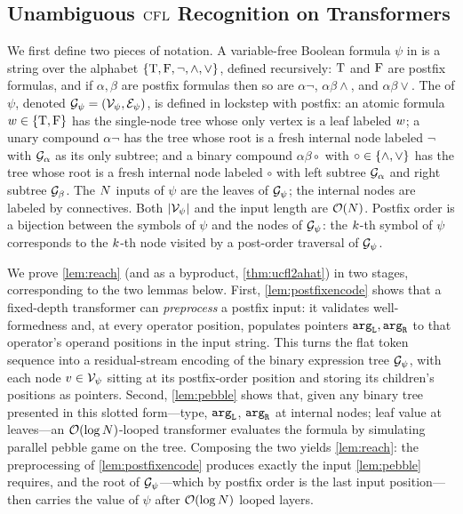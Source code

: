 \documentclass{article}
\begin{document}
\subsection{Unambiguous ${\textsc{CFL}}$ Recognition on Transformers}\label{app:ucflproofs}
We first define two pieces of notation.
A variable-free Boolean formula $\psi$ in  is a string over the alphabet ${{\{ {\mathbin{\mathrm{T}}}, {\mathbin{\mathrm{F}}}, \neg, \land, \lor \}}}$, defined recursively: ${\mathbin{\mathrm{T}}}$ and ${\mathbin{\mathrm{F}}}$ are postfix formulas, and if $\alpha, \beta$ are postfix formulas then so are $\alpha\neg$, $\alpha\beta\land$, and $\alpha\beta\lor$.
The  of $\psi$, denoted ${ \mathcal{G}}_\psi = ({\mathcal{V}}_\psi, {\mathcal{E}}_\psi)$, is defined in lockstep with postfix: an atomic formula ${w} \in {{\{ {\mathbin{\mathrm{T}}}, {\mathbin{\mathrm{F}}}\}}}$ has the single-node tree whose only vertex is a leaf labeled ${w}$; a unary compound $\alpha\neg$ has the tree whose root is a fresh internal node labeled $\neg$ with ${ \mathcal{G}}_\alpha$ as its only subtree; and a binary compound $\alpha\beta\circ$ with $\circ \in {{\{ \land, \lor \}}}$ has the tree whose root is a fresh internal node labeled $\circ$ with left subtree ${ \mathcal{G}}_\alpha$ and right subtree ${ \mathcal{G}}_\beta$.
The ${{ N}}$ inputs of $\psi$ are the leaves of ${ \mathcal{G}}_\psi$; the internal nodes are labeled by connectives.
Both $|{\mathcal{V}}_\psi|$ and the input length are ${{ \mathcal{O}}}({{ N}})$.
Postfix order is a bijection between the symbols of $\psi$ and the nodes of ${ \mathcal{G}}_\psi$: the ${{ k}}$-th symbol of $\psi$ corresponds to the ${{ k}}$-th node visited by a post-order traversal of ${ \mathcal{G}}_\psi$.

We prove \cref{lem:reach} (and as a byproduct, \cref{thm:ucfl2ahat}) in two stages, corresponding to the two lemmas below.
First, \cref{lem:postfixencode} shows that a fixed-depth transformer can \emph{preprocess} a postfix input: it validates well-formedness and, at every operator position, populates pointers ${\mathtt{arg}_\mathtt{L}}, {\mathtt{arg}_\mathtt{R}}$ to that operator's operand positions in the input string.
This turns the flat token sequence into a residual-stream encoding of the binary expression tree ${ \mathcal{G}}_\psi$, with each node $v \in {\mathcal{V}}_\psi$ sitting at its postfix-order position and storing its children's positions as pointers.
Second, \cref{lem:pebble} shows that, given any binary tree presented in this slotted form---type, ${\mathtt{arg}_\mathtt{L}}$, ${\mathtt{arg}_\mathtt{R}}$ at internal nodes; leaf value at leaves---an ${{ \mathcal{O}}}(\log {{ N}})$-looped transformer evaluates the formula by simulating  parallel pebble game on the tree.
Composing the two yields \cref{lem:reach}: the preprocessing of \cref{lem:postfixencode} produces exactly the input \cref{lem:pebble} requires, and the root of ${ \mathcal{G}}_\psi$---which by postfix order is the last input position---then carries the value of $\psi$ after ${{ \mathcal{O}}}(\log {{ N}})$ looped layers.
\end{document}
